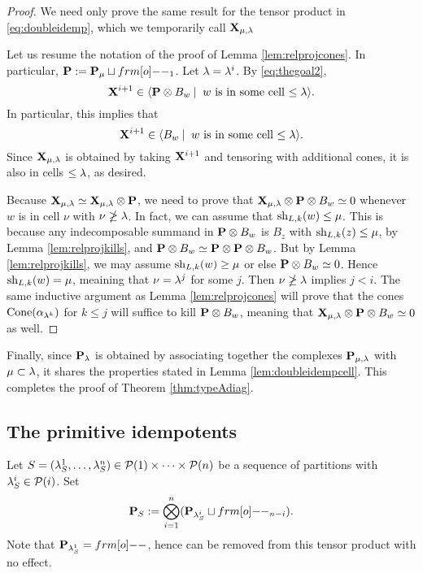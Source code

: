 \begin{proof}
We need only prove the same result for the tensor product in \eqref{eq:doubleidemp}, which we temporarily call ${\mathbf X}_{\mu,\lambda}$

Let us resume the notation of the proof of Lemma \ref{lem:relprojcones}.  In particular, $\PB:=\PB_\mu\sqcup \one_1$.  Let $\lambda = \lambda^i$. By \eqref{eq:thegoal2},
\[ {\mathbf X}^{i+1} \in \langle {\mathbf P} \otimes B_w\:|\: \text{ $w$ is in some cell $\le \lambda$}\rangle. \] In particular, this implies that
\[ {\mathbf X}^{i+1} \in \langle B_w\:|\: \text{ $w$ is in some cell $\le \lambda$}\rangle. \] Since ${\mathbf X}_{\mu,\lambda}$ is obtained by taking ${\mathbf X}^{i+1}$ and tensoring with additional cones, it is also in cells $\le \lambda$, as desired.

Because ${\mathbf X}_{\mu,\lambda} \simeq {\mathbf X}_{\mu,\lambda} \otimes {\mathbf P}$, we need to prove that ${\mathbf X}_{\mu,\lambda} \otimes {\mathbf P} \otimes B_w \simeq 0$ whenever $w$ is in cell $\nu$ with $\nu \ngeq \lambda$. In fact, we can assume that
$\operatorname{sh}_{L,k}(w) \le \mu$. This is because any indecomposable summand in ${\mathbf P} \otimes B_w$ is $B_z$ with $\operatorname{sh}_{L,k}(z) \le \mu$, by Lemma \ref{lem:relprojkills}, and ${\mathbf P} \otimes B_w \simeq
{\mathbf P} \otimes {\mathbf P} \otimes B_w$. But by Lemma \ref{lem:relprojkills}, we may assume $\operatorname{sh}_{L,k}(w) \ge \mu$ or else ${\mathbf P} \otimes B_w \simeq 0$. Hence $\operatorname{sh}_{L,k}(w) = \mu$, meaining that $\nu =
\lambda^j$ for some $j$. Then $\nu \ngeq \lambda$ implies $j < i$. The same inductive argument as Lemma \ref{lem:relprojcones} will prove that the cones $\operatorname{Cone}(\alpha_{\lambda^k})$ for $k \le j$ will
suffice to kill ${\mathbf P} \otimes B_w$, meaning that ${\mathbf X}_{\mu,\lambda} \otimes {\mathbf P} \otimes B_w \simeq 0$ as well. \end{proof}


Finally, since ${\mathbf P}_\lambda$ is obtained by associating together the complexes ${\mathbf P}_{\mu,\lambda}$ with $\mu\subset \lambda$, it shares the properties stated in Lemma \ref{lem:doubleidempcell}. This
completes the proof of Theorem \ref{thm:typeAdiag}.

\subsection{The primitive idempotents}
\label{subsec:primitives}

\begin{definition} \label{defn:PS}
Let $S=(\lambda_S^{1},\ldots,\lambda_S^{n})\in {\mathcal{P}}(1)\times \cdots \times {\mathcal{P}}(n)$ be a sequence of partitions with $\lambda_S^{i}\in{\mathcal{P}}(i)$.  Set
\[
\PB_S := \bigotimes_{i=1}^n (\PB_{\l_S^i}\sqcup \one_{n-i}).
\]
Note that $\PB_{\l_S^1}=\one$, hence can be removed from this tensor product with no effect.
\end{definition}

